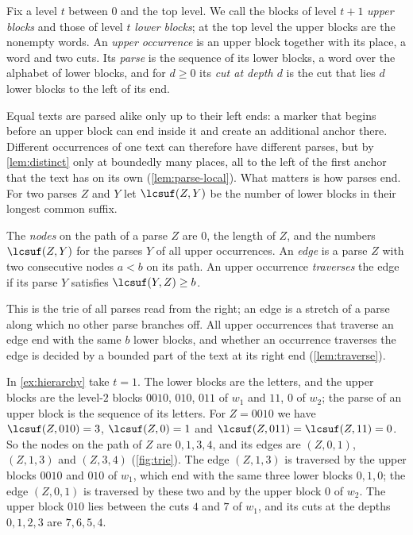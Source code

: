 Fix a level $t$ between $0$ and the top level. We call the blocks of level
$t+1$ \emph{upper blocks} and those of level $t$ \emph{lower blocks}; at the
top level the upper blocks are the nonempty words. An \emph{upper occurrence}
is an upper block together with its place, a word and two cuts. Its
\emph{parse} is the sequence of its lower blocks, a word over the alphabet of
lower blocks, and for $d\ge0$ its \emph{cut at depth $d$} is the cut that
lies $d$ lower blocks to the left of its end.

Equal texts are parsed alike only up to their left ends: a marker that
begins before an upper block can end inside it and create an additional
anchor there. Different occurrences of one text can therefore have different
parses, but by \cref{lem:distinct} only at boundedly many places, all to the
left of the first anchor that the text has on its own
(\cref{lem:parse-local}). What matters is how parses end. For two parses $Z$
and $Y$ let $\lcsuf(Z,Y)$ be the number of lower blocks in their longest
common suffix.

\begin{definition}\label{def:trie}
The \emph{nodes} on the path of a parse $Z$ are $0$, the length of $Z$, and
the numbers $\lcsuf(Z,Y)$ for the parses $Y$ of all upper occurrences. An
\emph{edge} is a parse $Z$ with two consecutive nodes $a<b$ on its path. An
upper occurrence \emph{traverses} the edge if its parse $Y$ satisfies
$\lcsuf(Y,Z)\ge b$.
\end{definition}

This is the trie of all parses read from the right; an edge is a stretch of
a parse along which no other parse branches off. All upper occurrences that
traverse an edge end with the same $b$ lower blocks, and whether an
occurrence traverses the edge is decided by a bounded part of the text at
its right end (\cref{lem:traverse}).

\begin{example}\label{ex:trie}
In \cref{ex:hierarchy} take $t=1$. The lower blocks are the letters, and the
upper blocks are the level-$2$ blocks $0010$, $010$, $011$ of $w_1$ and
$11$, $0$ of $w_2$; the parse of an upper block is the sequence of its
letters. For $Z=0010$ we have $\lcsuf(Z,010)=3$, $\lcsuf(Z,0)=1$ and
$\lcsuf(Z,011)=\lcsuf(Z,11)=0$. So the nodes on the path of $Z$ are
$0,1,3,4$, and its edges are $(Z,0,1)$, $(Z,1,3)$ and $(Z,3,4)$
(\cref{fig:trie}). The edge $(Z,1,3)$ is traversed by the upper blocks
$0010$ and $010$ of $w_1$, which end with the same three lower blocks
$0,1,0$; the edge $(Z,0,1)$ is traversed by these two and by the upper block
$0$ of $w_2$. The upper block $010$ lies between the cuts $4$ and $7$ of
$w_1$, and its cuts at the depths $0,1,2,3$ are $7,6,5,4$.
\end{example}

